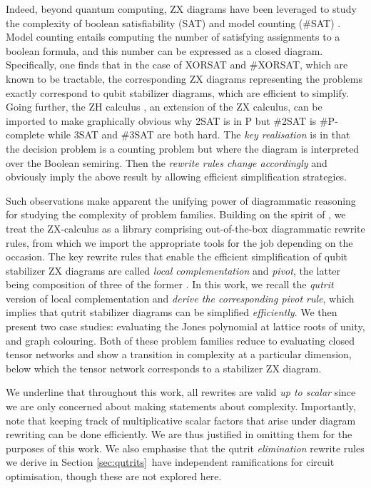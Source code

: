 Indeed, beyond quantum computing, ZX diagrams have been leveraged to study the complexity of boolean satisfiability (SAT) and model counting (\#SAT) \cite{debeaudrap2020tensor}.
Model counting entails computing the number of satisfying assignments to a boolean formula,
and this number can be expressed as a closed diagram.
Specifically, one finds that in the case of XORSAT and \#XORSAT,
which are known to be tractable,
the corresponding ZX diagrams representing the problems exactly correspond to qubit stabilizer diagrams, which are efficient to simplify.
Going further, the ZH calculus \cite{backens2018zh}, an extension of the ZX calculus, can be imported to make graphically obvious
why 2SAT is in P but \#2SAT is \#P-complete while 3SAT and \#3SAT are both hard.
The \emph{key realisation} is in that the decision problem is a counting problem
but where the diagram is interpreted over the Boolean semiring.
Then the \emph{rewrite rules change accordingly} and obviously imply the above result by allowing efficient simplification strategies.

Such observations make apparent the unifying power of diagrammatic reasoning
for studying the complexity of problem families.  
Building on the spirit of \cite{debeaudrap2020tensor}, we treat the ZX-calculus as a library comprising out-of-the-box diagrammatic rewrite rules, from which we import the appropriate tools for the job depending on the occasion.
The key rewrite rules that enable the efficient simplification
of qubit stabilizer ZX diagrams
are called \emph{local complementation} and \emph{pivot},
the latter being composition of three of the former \cite{graph_theoretic_simplification}.
In this work, we recall the \emph{qutrit} version of local complementation and \emph{derive the corresponding pivot rule},
which implies that qutrit stabilizer diagrams can be simplified \emph{efficiently}.
We then present two case studies: evaluating the Jones polynomial at lattice roots of unity, and graph colouring.
Both of these problem families reduce to evaluating
closed tensor networks and show a transition in complexity
at a particular dimension, below which the tensor network corresponds to a stabilizer ZX diagram.

We underline that throughout this work, all rewrites are valid
\emph{up to scalar}
since we are only concerned about making statements about complexity.
Importantly, note that keeping track of multiplicative scalar factors that arise under diagram rewriting can be done efficiently.
We are thus justified in omitting them for the purposes of this work. We also emphasise that the qutrit \emph{elimination} rewrite rules we derive in Section \ref{sec:qutrits}\ have independent ramifications for circuit optimisation, though these are not explored here.
